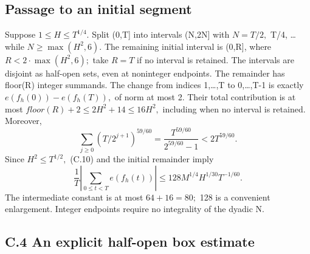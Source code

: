 \documentclass[11pt,a4paper]{article}
\begin{document}
\subsection{Passage to an initial
segment}\label{passage-to-an-initial-segment}

Suppose \(1\le H\le T^{1/4}.\) Split (0,T{]} into intervals (N,2N{]}
with \(N=T/2,\) T/4, \ldots{} while \(N\ge \max(H^2,6).\) The remaining
initial interval is (0,R{]}, where \(R<2\cdot \max(H^2,6);\) take
\(R=T\) if no interval is retained. The intervals are disjoint as
half-open sets, even at noninteger endpoints. The remainder has floor(R)
integer summands. The change from indices 1,\ldots,T to 0,\ldots,T-1 is
exactly \(e(f_h(0))-e(f_h(T)),\) of norm at most 2. Their total
contribution is at most \(floor(R)+2\le 2H^2+14\le 16H^2,\) including
when no interval is retained. Moreover, \[
\sum_{j\ge0}(T/2^{j+1})^{59/60}
=\frac{T^{59/60}}{2^{59/60}-1}<2T^{59/60}.
\] Since \(H^2\le T^{1/2},\) (C.10) and the initial remainder imply \[
\frac1T\left|\sum_{0\le t<T}e(f_h(t))\right|
\le128M^{1/4}H^{1/30}T^{-1/60}. \tag{C.11}
\] The intermediate constant is at most \(64+16=80;\) 128 is a
convenient enlargement. Integer endpoints require no integrality of the
dyadic N.

\subsection{C.4 An explicit half-open box
estimate}\label{c.4-an-explicit-half-open-box-estimate}
\end{document}
